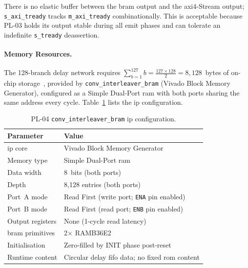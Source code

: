 There is no elastic buffer between the \ac{bram} output and the
\ac{axi}4-Stream output; \texttt{s\_axi\_tready} tracks
\texttt{m\_axi\_tready} combinationally.
This is acceptable because PL-03 holds its output stable during all
emit phases and can tolerate an indefinite \texttt{s\_tready}
deassertion.


\FloatBarrier
\paragraph{Memory Resources.}

The 128-branch delay network requires
$\sum_{b=1}^{127} b = \tfrac{127 \times 128}{2} = 8{,}128$~bytes of
on-chip storage~\cite{ITU_J83}, provided by
\texttt{conv\_interleaver\_bram} (Vivado Block Memory Generator),
configured as a Simple Dual-Port \ac{ram} with both ports sharing the
same address every cycle.
Table~\ref{tab:pl04_bram} lists the \ac{ip} configuration.

\begin{table}[htbp]
  \caption{PL-04 \texttt{conv\_interleaver\_bram} \ac{ip} configuration.}
  \label{tab:pl04_bram}
  \centering
  \small
  \begin{tabular}{ll}
    \hline
    Parameter              & Value \\
    \hline
    \ac{ip} core           & Vivado Block Memory Generator \\[2pt]
    Memory type            & Simple Dual-Port \ac{ram} \\[2pt]
    Data width             & 8~bits (both ports) \\[2pt]
    Depth                  & 8{,}128 entries (both ports) \\[2pt]
    Port~A mode            & Read First (write port; \texttt{ENA} pin enabled) \\[2pt]
    Port~B mode            & Read First (read port; \texttt{ENB} pin enabled) \\[2pt]
    Output registers       & None (1-cycle read latency) \\[2pt]
    \ac{bram} primitives   & 2$\times$ RAMB36E2 \\[2pt]
    Initialisation         & Zero-filled by INIT phase post-reset \\[2pt]
    Runtime content        & Circular delay \ac{fifo} data; no fixed \ac{rom} content \\
    \hline
  \end{tabular}
\end{table}
\FloatBarrier

